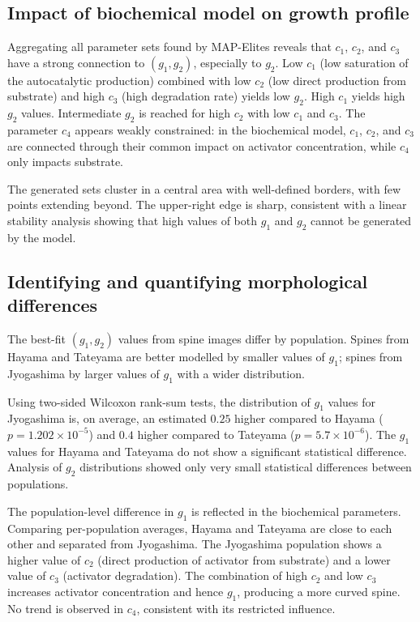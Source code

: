 \documentclass[11pt]{article}
\begin{document}
\subsection{Impact of biochemical model on growth profile}
Aggregating all parameter sets found by MAP-Elites reveals that $c_1$, $c_2$, and $c_3$ have a strong connection to $(g_1,g_2)$, especially to $g_2$. Low $c_1$ (low saturation of the autocatalytic production) combined with low $c_2$ (low direct production from substrate) and high $c_3$ (high degradation rate) yields low $g_2$. High $c_1$ yields high $g_2$ values. Intermediate $g_2$ is reached for high $c_2$ with low $c_1$ and $c_3$. The parameter $c_4$ appears weakly constrained: in the biochemical model, $c_1$, $c_2$, and $c_3$ are connected through their common impact on activator concentration, while $c_4$ only impacts substrate.

The generated sets cluster in a central area with well-defined borders, with few points extending beyond. The upper-right edge is sharp, consistent with a linear stability analysis showing that high values of both $g_1$ and $g_2$ cannot be generated by the model.

\subsection{Identifying and quantifying morphological differences}
The best-fit $(g_1,g_2)$ values from spine images differ by population. Spines from Hayama and Tateyama are better modelled by smaller values of $g_1$; spines from Jyogashima by larger values of $g_1$ with a wider distribution.

Using two-sided Wilcoxon rank-sum tests, the distribution of $g_1$ values for Jyogashima is, on average, an estimated $0.25$ higher compared to Hayama ($p = 1.202 \times 10^{-5}$) and $0.4$ higher compared to Tateyama ($p = 5.7 \times 10^{-6}$). The $g_1$ values for Hayama and Tateyama do not show a significant statistical difference. Analysis of $g_2$ distributions showed only very small statistical differences between populations.

The population-level difference in $g_1$ is reflected in the biochemical parameters. Comparing per-population averages, Hayama and Tateyama are close to each other and separated from Jyogashima. The Jyogashima population shows a higher value of $c_2$ (direct production of activator from substrate) and a lower value of $c_3$ (activator degradation). The combination of high $c_2$ and low $c_3$ increases activator concentration and hence $g_1$, producing a more curved spine. No trend is observed in $c_4$, consistent with its restricted influence.
\end{document}
